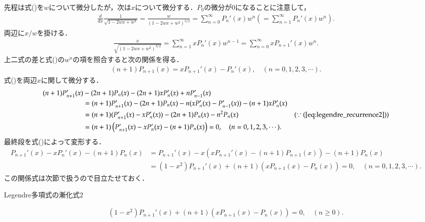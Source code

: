 \documentclass[a4j,papersize,disablejfam,slide,14pt]{jsarticle}
\begin{document}
    先程は式()を$w$について微分したが，次は$x$について微分する．$P_0$の微分が$0$になることに注意して，
    \begin{align}
    	\frac{d}{dx} \frac{1}{\sqrt{1 - 2wx + w^2}} = \frac{w}{(1 - 2wx + w^2)^{3/2}} = \sum_{n=0}^{\infty} P_n'(x) w^n (= \sum_{n=1}^{\infty} P_n'(x) w^n).
    \end{align}
    両辺に$x/w$を掛ける．
    \begin{align}
    	\frac{x}{\sqrt{(1 - 2wx + w^2)^{3/2}}} = \sum_{n=1}^{\infty} x P_n'(x) w^{n-1} = \sum_{n=0}^{\infty} x P_{n+1}'(x) w^n.
    \end{align}
    上二式の差と式()の$w^n$の項を照合すると次の関係を得る．
    \begin{align}
    	(n+1) P_{n+1}(x) = x P_{n+1}'(x) - P_n'(x), \quad (n = 0,1,2,3,\cdots). \label{eq:legendre_recurrence2}
    \end{align}
    式()を両辺$x$に関して微分する．
    \begin{align}
    	(n+1)P_{n+1}'(x) &- (2n+1)P_n(x) - (2n+1)xP_n'(x) + nP_{n-1}'(x) \\
        &= (n+1)P_{n+1}'(x) - (2n+1)P_n(x) - n(xP_n'(x) - P_{n-1}'(x))  - (n+1)xP_n'(x) \\
        &= (n+1) (P_{n+1}'(x) - xP_n'(x)) - (2n+1)P_n(x) - n^2 P_n(x) & (\because (\refeq{eq:legendre_recurrence2}))\\
        &= (n+1) \left(P_{n+1}'(x) - xP_n'(x) - (n+1)P_n(x)\right) = 0, \quad (n=0,1,2,3,\cdots).
    \end{align}
    最終段を式()によって変形する．
    \begin{align}
    	P_{n+1}'(x) - xP_n'(x) - (n+1)P_n(x) &= P_{n+1}'(x) - x\left(xP_{n+1}'(x) - (n+1) P_{n+1}(x)\right) - (n+1)P_n(x) \\
        &= (1-x^2) P_{n+1}'(x) + (n+1) \left(xP_{n+1}(x) - P_n(x)\right) = 0, \quad (n=0,1,2,3,\cdots).
    \end{align}
    この関係式は次節で扱うので目立たせておく．
    \begin{screen}
    	\begin{description}
        	\item[{\rm Legendre}多項式の漸化式$2$]
            \begin{align}
            	(1-x^2) P_{n+1}'(x) + (n+1) (xP_{n+1}(x) - P_n(x)) = 0, \quad (n \geq 0). \label{eq:legendre_recurrence2}
            \end{align}
        \end{description}
    \end{screen}
    
\end{document}
